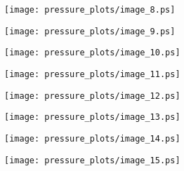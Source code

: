 \documentclass[11pt]{amsart}
\theoremstyle{plain}%
\theoremstyle{definition}
\theoremstyle{remark}
\numberwithin{equation}{thm}
\begin{document}
\begin{figure}[H]
\begin{center}
\texttt{[image: pressure\_plots/image\_8.ps]} 
\end{center}
\end{figure}

\begin{figure}[H]
\begin{center}
\texttt{[image: pressure\_plots/image\_9.ps]} 
\end{center}
\end{figure}

\begin{figure}[H]
\begin{center}
\texttt{[image: pressure\_plots/image\_10.ps]} 
\end{center}
\end{figure}

\begin{figure}[H]
\begin{center}
\texttt{[image: pressure\_plots/image\_11.ps]} 
\end{center}
\end{figure}

\begin{figure}[H]
\begin{center}
\texttt{[image: pressure\_plots/image\_12.ps]} 
\end{center}
\end{figure}

\begin{figure}[H]
\begin{center}
\texttt{[image: pressure\_plots/image\_13.ps]} 
\end{center}
\end{figure}

\begin{figure}[H]
\begin{center}
\texttt{[image: pressure\_plots/image\_14.ps]} 
\end{center}
\end{figure}

\begin{figure}[H]
\begin{center}
\texttt{[image: pressure\_plots/image\_15.ps]} 
\end{center}
\end{figure}
\end{document}
